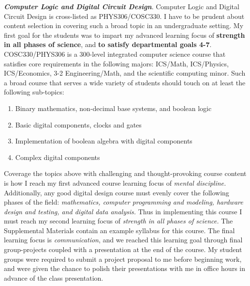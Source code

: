 \documentclass[../../../main.tex]{subfiles}
\begin{document}
\label{sec:adv_desc}

\textbf{\textit{Computer Logic and Digital Circuit Design}}. Computer Logic and Digital Circuit Design is cross-listed as PHYS306/COSC330.  I have to be prudent about content selection in covering such a broad topic in an undergraduate setting. My first goal for the students was to impart my advanced learning focus of \textbf{strength in all phases of science}, and \textbf{to satisfy departmental goals 4-7}.  COSC330/PHYS306 is a 300-level integrated computer science course that satisfies core requirements in the following majors: ICS/Math, ICS/Physics, ICS/Economics, 3-2 Engineering/Math, and the scientific computing minor.  Such a broad course that serves a wide variety of students should touch on at least the following sub-topics:

\begin{enumerate}
\item Binary mathematics, non-decimal base systems, and boolean logic
\item Basic digital components, clocks and gates
\item Implementation of boolean algebra with digital components
\item Complex digital components
\end{enumerate}

Coverage the topics above with challenging and thought-provoking course content is how I reach my first advanced course learning focus of \textit{mental discipline.}  Additionally, any good digital design course must evenly cover the following phases of the field: \textit{mathematics, computer programming and modeling, hardware design and testing, and digital data analysis.}  Thus in implementing this course I must reach my second learning focus of \textit{strength in all phases of science.}  The Supplemental Materials contain an example syllabus for this course.  The final learning focus is \textit{communication}, and we reached this learning goal through final group-projects coupled with a presentation at the end of the course.  My student groups were required to submit a project proposal to me before beginning work, and were given the chance to polish their presentations with me in office hours in advance of the class presentation. \\ \hspace{0.1cm}
\end{document}

